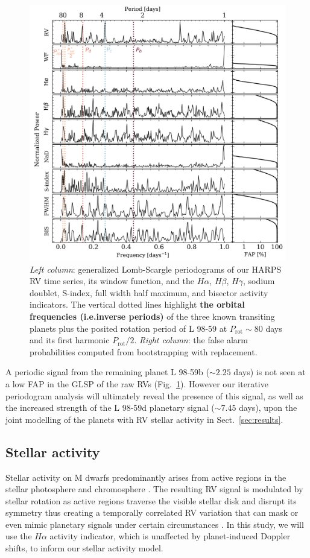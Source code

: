 \documentclass[longauth]{aa}
\begin{document}
\begin{figure}
    \centering
    \includegraphics[width=0.98\hsize]{periodogramsfreq.png}
    \caption{\emph{Left column}: generalized Lomb-Scargle periodograms of our HARPS RV time series, its window function, and the $H\alpha$, $H\beta$, $H\gamma$, sodium doublet, S-index, full width half maximum, and bisector activity indicators. The vertical dotted lines highlight \textbf{the orbital frequencies (i.e.inverse periods)} of the three known transiting planets plus the posited rotation period of L 98-59 at $P_{\text{rot}} \sim 80$ days and its first harmonic $P_{\text{rot}}/2$. \emph{Right column}: the false alarm probabilities computed from bootstrapping with replacement.}
    \label{fig:GLSP}
\end{figure}


A periodic signal from the remaining planet L 98-59b ($\sim 2.25$ days) is not seen at a low FAP in the GLSP of the raw RVs (Fig.~\ref{fig:GLSP}). However our iterative periodogram analysis will ultimately reveal the presence of this signal, as well as the increased strength of the L 98-59d planetary signal ($\sim 7.45$ days), upon the joint modelling of the planets with RV stellar activity in Sect.~\ref{sec:results}.

\subsection{Stellar activity}
\label{subsec:act}
Stellar activity on M dwarfs predominantly arises from active regions in the stellar photosphere and chromosphere \citep{lindegren03}. The resulting RV signal is modulated by stellar rotation as active regions traverse the visible stellar disk and disrupt its symmetry thus creating a temporally correlated RV variation that can mask or even  mimic planetary signals under certain circumstances \citep{vanderburg16}. In this study, we will use the $H\alpha$ activity indicator, which is unaffected by planet-induced Doppler shifts, to inform our stellar activity model. 
\end{document}
